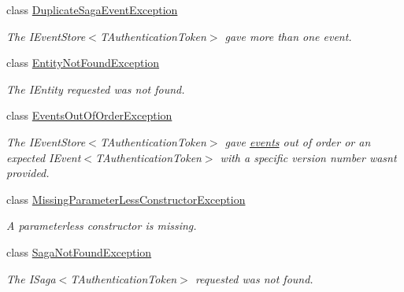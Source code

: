 \begin{DoxyCompactItemize}
class \hyperlink{classCqrs_1_1Domain_1_1Exceptions_1_1DuplicateSagaEventException}{Duplicate\+Saga\+Event\+Exception}
\begin{DoxyCompactList}\small\item\em The I\+Event\+Store$<$\+T\+Authentication\+Token$>$ gave more than one event. \end{DoxyCompactList}\item 
class \hyperlink{classCqrs_1_1Domain_1_1Exceptions_1_1EntityNotFoundException}{Entity\+Not\+Found\+Exception}
\begin{DoxyCompactList}\small\item\em The I\+Entity requested was not found. \end{DoxyCompactList}\item 
class \hyperlink{classCqrs_1_1Domain_1_1Exceptions_1_1EventsOutOfOrderException}{Events\+Out\+Of\+Order\+Exception}
\begin{DoxyCompactList}\small\item\em The I\+Event\+Store$<$\+T\+Authentication\+Token$>$ gave \hyperlink{}{events} out of order or an expected I\+Event$<$\+T\+Authentication\+Token$>$ with a specific version number wasn\textquotesingle{}t provided. \end{DoxyCompactList}\item 
class \hyperlink{classCqrs_1_1Domain_1_1Exceptions_1_1MissingParameterLessConstructorException}{Missing\+Parameter\+Less\+Constructor\+Exception}
\begin{DoxyCompactList}\small\item\em A parameterless constructor is missing. \end{DoxyCompactList}\item 
class \hyperlink{classCqrs_1_1Domain_1_1Exceptions_1_1SagaNotFoundException}{Saga\+Not\+Found\+Exception}
\begin{DoxyCompactList}\small\item\em The I\+Saga$<$\+T\+Authentication\+Token$>$ requested was not found. \end{DoxyCompactList}\end{DoxyCompactItemize}

